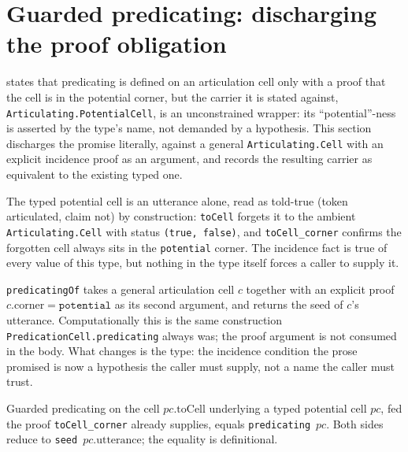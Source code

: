 \section{Guarded predicating: discharging the proof obligation}

 states that predicating is defined on an
articulation cell only with a proof that the cell is in the potential corner,
but the carrier it is stated against, \texttt{Articulating.PotentialCell}, is
an unconstrained wrapper: its ``potential''-ness is asserted by the type's
name, not demanded by a hypothesis. This section discharges the promise
literally, against a general \texttt{Articulating.Cell} with an explicit
incidence proof as an argument, and records the resulting carrier as
equivalent to the existing typed one.

\begin{proposition}\label{thm:potential-cell}\leanok{}
The typed potential cell is an utterance alone, read as told-true (token
articulated, claim not) by construction: \texttt{toCell} forgets it to the
ambient \texttt{Articulating.Cell} with status \texttt{(true, false)}, and
\texttt{toCell\_corner} confirms the forgotten cell always sits in the
\texttt{potential} corner. The incidence fact is true of every value of this
type, but nothing in the type itself forces a caller to supply it.
\end{proposition}

\begin{proposition}\label{thm:predicating-guarded}\leanok{}
\texttt{predicatingOf} takes a general articulation cell \(c\) together with
an explicit proof \(c.\mathrm{corner} = \mathtt{potential}\) as its second
argument, and returns the seed of \(c\)'s utterance. Computationally this is
the same construction \texttt{PredicationCell.predicating} always was; the
proof argument is not consumed in the body. What changes is the type: the
incidence condition the prose promised is now a hypothesis the caller must
supply, not a name the caller must trust.
\end{proposition}

\begin{theorem}\label{thm:predicating-guarded-agree}\leanok{}
Guarded predicating on the cell \(pc.\mathrm{toCell}\) underlying a typed
potential cell \(pc\), fed the proof \texttt{toCell\_corner} already supplies,
equals \texttt{predicating}~\(pc\). Both sides reduce to
\texttt{seed}~\(pc.\mathrm{utterance}\); the equality is definitional.
\end{theorem}

